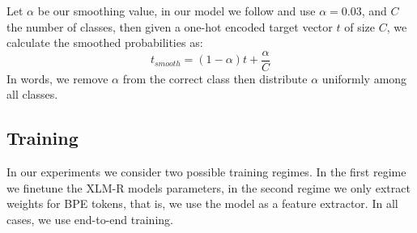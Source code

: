 \documentclass[11pt]{article}
\newcommand\citep{\cite}
\begin{document}
         Let $\alpha$ be our smoothing value, in our model we follow
     \citep{kondratyukstraka} and use $\alpha = 0.03$, and $C$ the
     number of classes, then given a one-hot encoded target vector $t$
     of size $C$, we calculate the smoothed probabilities as:
    \begin{equation}
        t_{smooth} = (1-\alpha)t + \frac{\alpha}{C}
    \end{equation}
    In words, we remove $\alpha$ from the correct class then
    distribute $\alpha$ uniformly among all classes.
     \subsection{Training}

     In our experiments we consider two possible training regimes. In
     the first regime we finetune the XLM-R models parameters, in the
     second regime we only extract weights for BPE tokens, that is, we
     use the model as a feature extractor. In all cases, we use
     end-to-end training.
     
\end{document}
